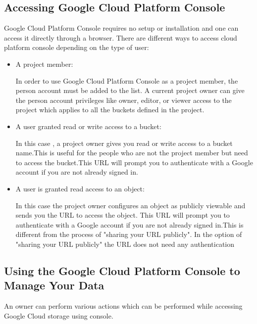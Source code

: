 \documentclass[9pt,twocolumn,twoside]{../../styles/osajnl}
\begin{document}
\subsection{Accessing Google Cloud Platform Console}


Google Cloud Platform Console requires no setup or installation and one can access it directly through a browser. There are different ways to access cloud platform console depending on the type of user:

\begin{itemize}
\item A project member: 

In order to use Google Cloud Platform Console as a project member, the person account must be added to the list. A current project owner can give the person account privileges like owner, editor, or viewer access to the project which applies to all the buckets defined in the project.

\item A user granted read or write access to a bucket:

In this case , a project owner  gives you read or write access to a bucket name.This is useful for the people who are not the project member but need to access the bucket.This URL will prompt you to authenticate with a Google account if you are not already signed in.
	

\item A user is granted read access to an object:

In this case the project owner configures an object as publicly viewable and sends you the URL to access the object. This URL will prompt you to authenticate with a Google account if you are not already signed in.This is different from the process of "sharing your URL publicly". In the option of "sharing your URL publicly" the URL does not need any authentication

\end{itemize}

\subsection{Using the Google Cloud Platform Console to Manage Your Data}

An owner can perform various actions which can be performed while accessing Google Cloud storage using console.
\end{document}
